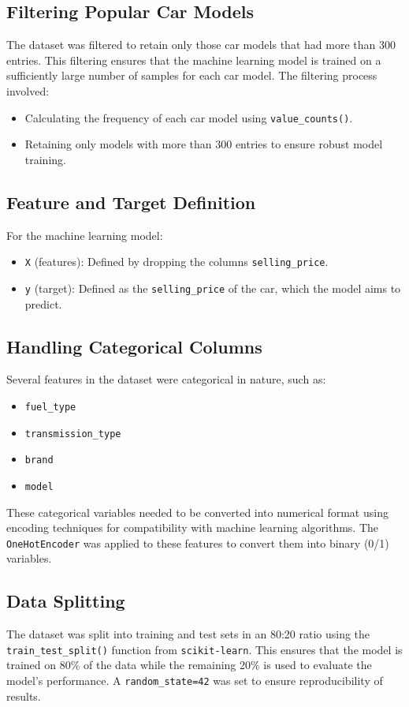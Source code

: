 \documentclass[a4paper,12pt]{article}
\begin{document}
\begin{justify}
\subsection{Filtering Popular Car Models}
The dataset was filtered to retain only those car models that had more than 300 entries. This filtering ensures that the machine learning model is trained on a sufficiently large number of samples for each car model. The filtering process involved:
\begin{itemize}
    \item Calculating the frequency of each car model using \texttt{value\_counts()}.
    \item Retaining only models with more than 300 entries to ensure robust model training.
\end{itemize}

\subsection{Feature and Target Definition}
For the machine learning model:
\begin{itemize}
    \item \texttt{X} (features): Defined by dropping the columns \texttt{selling\_price}.
    \item \texttt{y} (target): Defined as the \texttt{selling\_price} of the car, which the model aims to predict.
\end{itemize}

\subsection{Handling Categorical Columns}
Several features in the dataset were categorical in nature, such as:
\begin{itemize}
    \item \texttt{fuel\_type}
    \item \texttt{transmission\_type}
    \item \texttt{brand}
    \item \texttt{model}
\end{itemize}
These categorical variables needed to be converted into numerical format using encoding techniques for compatibility with machine learning algorithms. The \texttt{OneHotEncoder} was applied to these features to convert them into binary (0/1) variables.

\subsection{Data Splitting}
The dataset was split into training and test sets in an 80:20 ratio using the \texttt{train\_test\_split()} function from \texttt{scikit-learn}. This ensures that the model is trained on 80\% of the data while the remaining 20\% is used to evaluate the model's performance. A \texttt{random\_state=42} was set to ensure reproducibility of results.


\end{justify}
\end{document}

